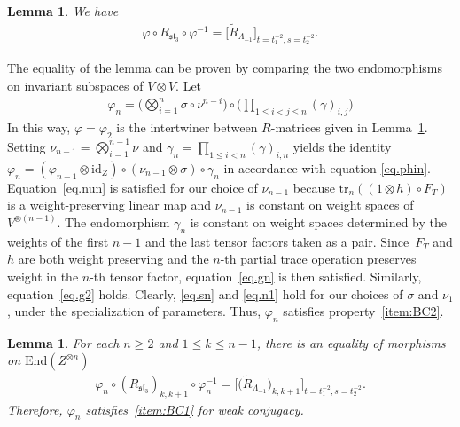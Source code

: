 \documentclass[10pt,a4paper]{amsart}
\numberwithin{equation}{section}
\newtheorem{Lemma}[Theorem]{Lemma}
\theoremstyle{definition}
\begin{document}
\begin{Lemma}\label{lem:R2}
We have
\begin{gather*}
 \varphi\circ {R}_{\mathfrak{sl}_3}\circ\varphi^{-1}=  \bigl\lbrack
\tilde{R}_{\Lambda_{-1}} \bigr\rbrack_{t=t_1^{-2}, s=t_2^{-2}} .
\end{gather*}
\end{Lemma}
The equality of the lemma can be proven by comparing the two endomorphisms on invariant subspaces
of $V\otimes V$.
Let
\begin{gather*}
 \varphi_n=\biggl(\bigotimes_{i=1}^n \sigma\circ\nu^{n-i}\biggr)\circ
 \biggl(\prod_{1\leq i<j\leq n}(\gamma)_{i,j}\biggr)
\end{gather*}
In this way, $\varphi=\varphi_2$ is the intertwiner between $R$-matrices given in
Lemma~\ref{lem:R2}. Setting $\nu_{n-1}=\bigotimes_{i=1}^{n-1} \nu$ and
$\gamma_n=\prod_{1\leq i<n} (\gamma)_{i,n}$ yields the identity
$\varphi_n=(\varphi_{n-1}\otimes \mathrm{id}_Z)\circ(\nu_{n-1}\otimes\sigma)\circ \gamma_n$
in accordance with equation \eqref{eq.phin}. Equation~\eqref{eq.nun} is satisfied
for our choice of $\nu_{n-1}$ because ${\mathrm{tr}_n((1\otimes h)\circ F_T)}$ is a
weight-preserving linear map and $\nu_{n-1}$ is constant on weight spaces of~$V^{\otimes (n-1)}$. The endomorphism $\gamma_n$ is constant on weight spaces determined
by the weights of the first $n-1$ and the last tensor factors taken as a pair.
Since~$F_T$ and $h$ are both weight preserving and the $n$-th partial trace
operation preserves weight in the $n$-th tensor factor, equation~\eqref{eq.gn} is
then satisfied. Similarly, equation~\eqref{eq.g2} holds. Clearly, \eqref{eq.sn} and \eqref{eq.n1} hold for our choices of $\sigma$ and $\nu_1$, under the
specialization of parameters. Thus, $\varphi_n$ satisfies property~\eqref{item:BC2}.

\begin{Lemma}\label{lem.Rn}
For each $n\geq 2$ and $1\leq k\leq n-1$, there is an equality of morphisms on
$\mathrm{End}(Z^{\otimes n})$
\begin{gather*}
\varphi_n\circ({R}_{\mathfrak{sl}_3})_{k,k+1}\circ\varphi_n^{-1}
= \bigl\lbrack \bigl(\tilde{R}_{\Lambda_{-1}}\bigr)_{k,k+1} \bigr\rbrack_{t=t_1^{-2}, s=t_2^{-2}} .
\end{gather*}
Therefore, $\varphi_n$ satisfies~\eqref{item:BC1} for weak conjugacy.
\end{Lemma}
\end{document}
